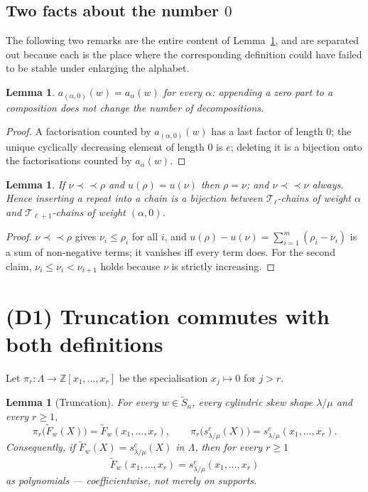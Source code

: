 \documentclass[11pt]{article}
\theoremstyle{plain}
\newtheorem{lem}[thm]{Lemma}
\theoremstyle{definition}
\newcommand{\Z}{\mathbb{Z}}
\newcommand{\Saff}{\widetilde{S}_{n}}
\newcommand{\Fw}{\widetilde{F}_{w}}
\newcommand{\hstrip}{\prec\!\!\prec}
\begin{document}
\subsection{Two facts about the number $0$}

The following two remarks are the entire content of Lemma~\ref{lem:trunc}, and are separated
out because each is the place where the corresponding definition could have failed to be
stable under enlarging the alphabet.

\begin{lem}\label{lem:zeroA}
$a_{(\alpha,0)}(w)=a_\alpha(w)$ for every $\alpha$: appending a zero part to a composition does
not change the number of decompositions.
\end{lem}
\begin{proof}
A factorisation counted by $a_{(\alpha,0)}(w)$ has a last factor of length $0$; the unique
cyclically decreasing element of length $0$ is $e$; deleting it is a bijection onto the
factorisations counted by $a_\alpha(w)$.
\end{proof}

\begin{lem}\label{lem:zeroB}
If $\nu\hstrip\rho$ and $u(\rho)=u(\nu)$ then $\rho=\nu$; and $\nu\hstrip\nu$ always. Hence
inserting a repeat into a chain is a bijection between $\mathcal T_\ell$-chains of weight
$\alpha$ and $\mathcal T_{\ell+1}$-chains of weight $(\alpha,0)$.
\end{lem}
\begin{proof}
$\nu\hstrip\rho$ gives $\nu_i\le\rho_i$ for all $i$, and $u(\rho)-u(\nu)=\sum_{i=1}^m(\rho_i-\nu_i)$
is a sum of non-negative terms; it vanishes iff every term does. For the second claim,
$\nu_i\le\nu_i<\nu_{i+1}$ holds because $\nu$ is strictly increasing.
\end{proof}

\section{(D1) Truncation commutes with both definitions}\label{sec:trunc}

Let $\pi_r:\Lambda\to\Z[x_1,\dots,x_r]$ be the specialisation $x_j\mapsto0$ for $j>r$.

\begin{lem}[Truncation]\label{lem:trunc}
For every $w\in\Saff$, every cylindric skew shape $\lambda/\mu$ and every $r\ge1$,
\[
  \pi_r\bigl(\Fw(X)\bigr)=\Fw(x_1,\dots,x_r),
  \qquad
  \pi_r\bigl(s^{c}_{\lambda/\mu}(X)\bigr)=s^{c}_{\lambda/\mu}(x_1,\dots,x_r).
\]
Consequently, if $\Fw(X)=s^{c}_{\lambda/\mu}(X)$ in $\Lambda$, then for every $r\ge1$
\[
  \Fw(x_1,\dots,x_r)=s^{c}_{\lambda/\mu}(x_1,\dots,x_r)
\]
as polynomials --- coefficientwise, not merely on supports.
\end{lem}
\end{document}
